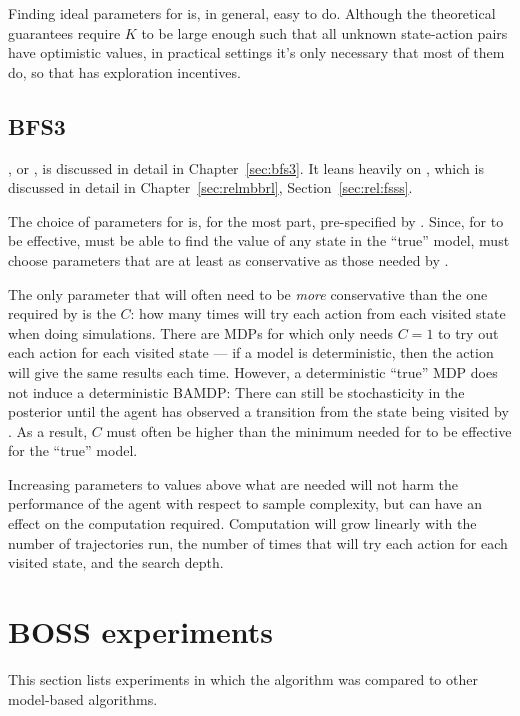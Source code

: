 Finding ideal parameters for  is, in general, easy to do. Although the theoretical guarantees require $K$ to be large enough such that all unknown state-action pairs have optimistic values, in practical settings it's only necessary that most of them do, so that  has exploration incentives.

\subsection{BFS3}

, or , is discussed in detail in Chapter~\ref{sec:bfs3}. It leans heavily on , which is discussed in detail in Chapter~\ref{sec:relmbbrl}, Section~\ref{sec:rel:fsss}.

The choice of parameters for  is, for the most part, pre-specified by . Since, for  to be effective,  must be able to find the value of any state in the ``true'' model,  must choose parameters that are at least as conservative as those needed by .

The only parameter that will often need to be \emph{more} conservative than the one required by  is the $C$: how many times  will try each action from each visited state when doing simulations. There are MDPs for which  only needs $C=1$ to try out each action for each visited state --- if a model is deterministic, then the action will give the same results each time. However, a deterministic ``true'' MDP does not induce a deterministic BAMDP: There can still be stochasticity in the posterior until the agent has observed a transition from the state being visited by . As a result, $C$ must often be higher than the minimum needed for  to be effective for the ``true'' model.

Increasing parameters to values above what are needed will not harm the performance of the agent with respect to sample complexity, but can have an effect on the computation required. Computation will grow linearly with the number of trajectories run, the number of times that  will try each action for each visited state, and the search depth.

\section{BOSS experiments}

This section lists experiments in which the  algorithm was compared to other model-based algorithms.


